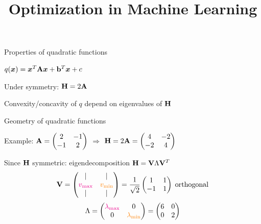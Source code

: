\documentclass[11pt,compress,t,notes=noshow, xcolor=table]{beamer}
\title{Optimization in Machine Learning}
\begin{document}

\begin{framei}{Properties of quadratic functions}
\item $q(\bm{x}) = \bm{x}^T \mathbf{A} \bm{x} + \mathbf{b}^T \bm{x} + c$
\item Under symmetry: $\mathbf{H} = 2 \mathbf{A}$
\item Convexity/concavity of $q$ depend on eigenvalues of $\mathbf{H}$
\end{framei}
  

\begin{framei}{Geometry of quadratic functions}
\item Example: $\mathbf{A} = \begin{pmatrix} 2 & -1 \\ -1 & 2\end{pmatrix}$ $\Rightarrow$ $\mathbf{H} = 2\mathbf{A} = \begin{pmatrix} 4 & -2 \\ -2 & 4\end{pmatrix}$
\item Since $\mathbf{H}$ symmetric: eigendecomposition $\mathbf{H} = \mathbf{V}\Lambda\mathbf{V}^T$
\begin{equation*}
\mathbf{V} = \begin{pmatrix}
| & | \\
\textcolor{magenta}{v_\text{max}} & \textcolor{orange}{v_\text{min}} \\
| & |
\end{pmatrix}
= \frac{1}{\sqrt{2}} \begin{pmatrix}
1 & 1 \\
-1 & 1
\end{pmatrix}\;\text{orthogonal}
\end{equation*}
\begin{equation*}
\Lambda = \begin{pmatrix}
\textcolor{magenta}{\lambda_\text{max}} & 0 \\
0 & \textcolor{orange}{\lambda_\text{min}}
\end{pmatrix}
= \begin{pmatrix}6 & 0 \\ 0 & 2\end{pmatrix}
\end{equation*}
\end{framei}
\end{document}
